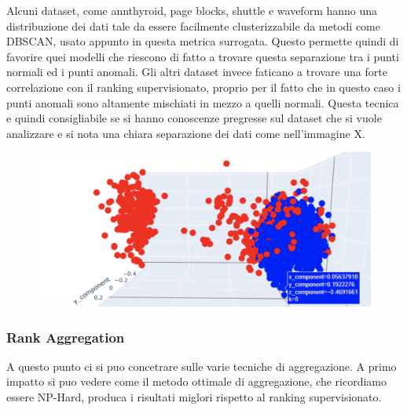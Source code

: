 Alcuni dataset, come annthyroid, page blocks, shuttle e waveform hanno una distribuzione dei dati tale da essere facilmente clusterizzabile da metodi come DBSCAN, usato appunto in questa metrica surrogata. Questo permette quindi di favorire quei modelli che riescono di fatto a trovare questa separazione tra i punti normali ed i punti anomali.
Gli altri dataset invece faticano a trovare una forte correlazione con il ranking supervisionato, proprio per il fatto che in questo caso i punti anomali sono altamente mischiati in mezzo a quelli normali.
Questa tecnica e quindi consigliabile se si hanno conoscenze pregresse sul dataset che si vuole analizzare e si nota una chiara separazione dei dati come nell'immagine X.
\begin{figure}[t]
\includegraphics[width=14cm, scale=1]{images/plot-anomalies-normal}
\centering
\end{figure}

\subsubsection{Rank Aggregation}
A questo punto ci si puo concetrare sulle varie tecniche di aggregazione. A primo impatto si puo vedere come il metodo ottimale di aggregazione, che ricordiamo essere NP-Hard, produca i risultati miglori rispetto al ranking supervisionato. 


